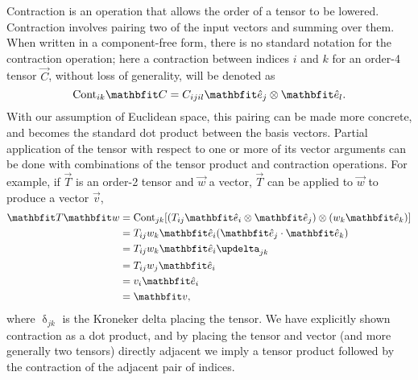 Contraction is an operation that allows the order of a tensor to be lowered.
Contraction involves pairing two of the input vectors and summing over them.
When written in a component-free form, there is no standard notation for the contraction operation; here a contraction between indices $i$ and $k$ for an order-4 tensor $\vec{C}$, without loss of generality, will be denoted as
\begin{equation}
    \textrm{Cont}_{ik} \vec{C} = C_{ijil} \unitvec_{j} \otimes \unitvec_{l}.
\end{equation}
With our assumption of Euclidean space, this pairing can be made more concrete, and becomes the standard dot product between the basis vectors.
Partial application of the tensor with respect to one or more of its vector arguments can be done with combinations of the tensor product and contraction operations.
For example, if $\vec{T}$ is an order-2 tensor and $\vec{w}$ a vector, $\vec{T}$ can be applied to $\vec{w}$ to produce a vector $\vec{v}$,
\begin{align}
    \vec{T} \vec{w} &= \textrm{Cont}_{jk} [(T_{ij} \unitvec_{i} \otimes \unitvec_{j}) \otimes (w_k \unitvec_{k})] \nonumber\\
                    &= T_{ij} w_{k} \unitvec_{i} (\unitvec_{j} \cdot \unitvec_{k}) \nonumber\\
                    &= T_{ij} w_{k} \unitvec_{i} \updelta_{jk} \nonumber\\
                    &= T_{ij} w_{j} \unitvec_{i} \nonumber\\
                    &= v_{i} \unitvec_{i} \nonumber\\
                    &= \vec{v},
\end{align}
where $\updelta_{jk}$ is the Kroneker delta placing the tensor.
We have explicitly shown contraction as a dot product, and by placing the tensor and vector (and more generally two tensors) directly adjacent we imply a tensor product followed by the contraction of the adjacent pair of indices.

